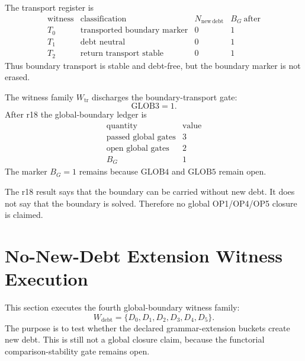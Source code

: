 \begin{proposition}
The transport register is
\[
\begin{array}{c|c|r|r}
\text{witness} & \text{classification} & N_{\mathrm{new\,debt}} & B_G\ \text{after}\\
\hline
T_0 & \text{transported boundary marker} & 0 & 1\\
T_1 & \text{debt neutral} & 0 & 1\\
T_2 & \text{return transport stable} & 0 & 1
\end{array}
\]
Thus boundary transport is stable and debt-free, but the boundary marker is
not erased.
\end{proposition}

\begin{theorem}
The witness family \(W_{\mathrm{tr}}\) discharges the boundary-transport gate:
\[
    \mathrm{GLOB3}=1.
\]
After r18 the global-boundary ledger is
\[
\begin{array}{c|r}
\text{quantity} & \text{value}\\
\hline
\text{passed global gates} & 3\\
\text{open global gates} & 2\\
B_G & 1
\end{array}
\]
The marker \(B_G=1\) remains because \(\mathrm{GLOB4}\) and
\(\mathrm{GLOB5}\) remain open.
\end{theorem}

\begin{remark}
The r18 result says that the boundary can be carried without new debt.  It
does not say that the boundary is solved.  Therefore no global OP1/OP4/OP5
closure is claimed.
\end{remark}



\section{No-New-Debt Extension Witness Execution}
\label{sec:v450-r19-execute-wdebt-no-new-debt-extension}

This section executes the fourth global-boundary witness family:
\[
    W_{\mathrm{debt}}=\{D_0,D_1,D_2,D_3,D_4,D_5\}.
\]
The purpose is to test whether the declared grammar-extension buckets create
new debt.  This is still not a global closure claim, because the functorial
comparison-stability gate remains open.

